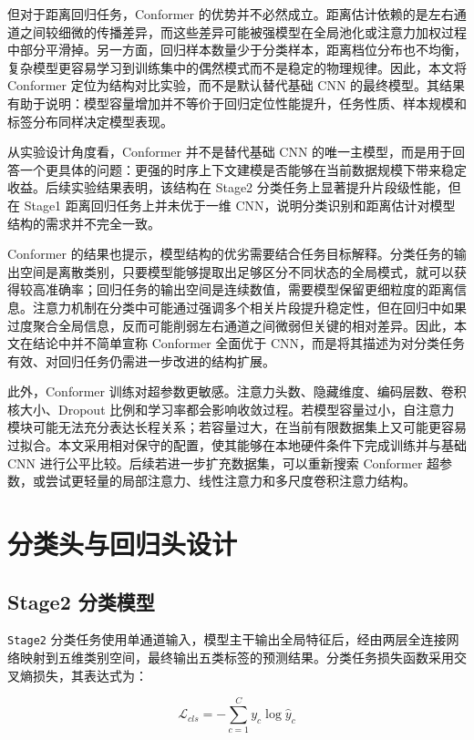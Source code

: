 但对于距离回归任务，Conformer 的优势并不必然成立。距离估计依赖的是左右通道之间较细微的传播差异，而这些差异可能被强模型在全局池化或注意力加权过程中部分平滑掉。另一方面，回归样本数量少于分类样本，距离档位分布也不均衡，复杂模型更容易学习到训练集中的偶然模式而不是稳定的物理规律。因此，本文将 Conformer 定位为结构对比实验，而不是默认替代基础 CNN 的最终模型。其结果有助于说明：模型容量增加并不等价于回归定位性能提升，任务性质、样本规模和标签分布同样决定模型表现。

从实验设计角度看，Conformer 并不是替代基础 CNN 的唯一主模型，而是用于回答一个更具体的问题：更强的时序上下文建模是否能够在当前数据规模下带来稳定收益。后续实验结果表明，该结构在 Stage2 分类任务上显著提升片段级性能，但在 Stage1 距离回归任务上并未优于一维 CNN，说明分类识别和距离估计对模型结构的需求并不完全一致。

Conformer 的结果也提示，模型结构的优劣需要结合任务目标解释。分类任务的输出空间是离散类别，只要模型能够提取出足够区分不同状态的全局模式，就可以获得较高准确率；回归任务的输出空间是连续数值，需要模型保留更细粒度的距离信息。注意力机制在分类中可能通过强调多个相关片段提升稳定性，但在回归中如果过度聚合全局信息，反而可能削弱左右通道之间微弱但关键的相对差异。因此，本文在结论中并不简单宣称 Conformer 全面优于 CNN，而是将其描述为对分类任务有效、对回归任务仍需进一步改进的结构扩展。

此外，Conformer 训练对超参数更敏感。注意力头数、隐藏维度、编码层数、卷积核大小、Dropout 比例和学习率都会影响收敛过程。若模型容量过小，自注意力模块可能无法充分表达长程关系；若容量过大，在当前有限数据集上又可能更容易过拟合。本文采用相对保守的配置，使其能够在本地硬件条件下完成训练并与基础 CNN 进行公平比较。后续若进一步扩充数据集，可以重新搜索 Conformer 超参数，或尝试更轻量的局部注意力、线性注意力和多尺度卷积注意力结构。

\section{分类头与回归头设计}

\subsection{Stage2 分类模型}

\texttt{Stage2} 分类任务使用单通道输入，模型主干输出全局特征后，经由两层全连接网络映射到五维类别空间，最终输出五类标签的预测结果。分类任务损失函数采用交叉熵损失，其表达式为：

\begin{equation}
\mathcal{L}_{cls} = - \sum_{c=1}^{C} y_c \log \hat{y}_c
\end{equation}

